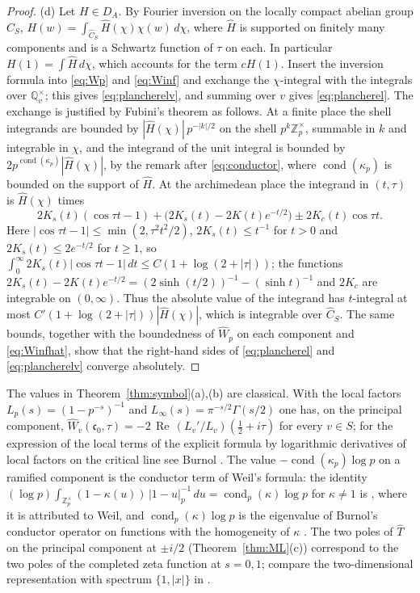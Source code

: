 \documentclass[11pt]{amsart}
\theoremstyle{definition}
\theoremstyle{remark}
\newcommand{\Z}{\mathbb Z}
\newcommand{\Q}{\mathbb Q}
\newcommand{\Rel}{\operatorname{Re}}
\newcommand{\Th}{\widehat{T}}
\newcommand{\Wh}{\widehat{W}}
\newcommand{\Ch}{\widehat{C}_S}
\newcommand{\DA}{D_A}
\newcommand{\cond}{\operatorname{cond}}
\begin{document}
\begin{proof}
(d)  Let $H\in\DA$.  By Fourier inversion on the locally compact abelian group
$C_S$, $H(w)=\int_{\Ch}\widehat H(\chi)\chi(w)\,d\chi$, where $\widehat H$ is
supported on finitely many components and is a Schwartz function of $\tau$ on
each.  In particular $H(1)=\int\widehat H\,d\chi$, which accounts for the term
$cH(1)$.  Insert the inversion formula into \eqref{eq:Wp} and
\eqref{eq:Winf} and exchange the $\chi$-integral with the integrals over
$\Q_v^{\times}$; this gives \eqref{eq:plancherelv}, and summing over $v$ gives
\eqref{eq:plancherel}.  The exchange is justified by Fubini's theorem as
follows.  At a finite place the shell integrands are bounded by
$|\widehat H(\chi)|\,p^{-|k|/2}$ on the shell $p^{k}\Z_p^{\times}$, summable in
$k$ and integrable in $\chi$, and the integrand of the unit integral is bounded by
$2p^{\cond(\kappa_p)}|\widehat H(\chi)|$, by the remark after \eqref{eq:conductor},
where $\cond(\kappa_p)$ is bounded on the support of $\widehat H$.  At the
archimedean place the integrand in $(t,\tau)$ is $\widehat H(\chi)$ times
\[
2K_{s}(t)(\cos\tau t-1)+\bigl(2K_{s}(t)-2K(t)e^{-t/2}\bigr)
\pm2K_{c}(t)\cos\tau t .
\]
Here $|\cos\tau t-1|\le\min(2,\tau^{2}t^{2}/2)$, $2K_{s}(t)\le t^{-1}$ for
$t>0$ and $2K_{s}(t)\le2e^{-t/2}$ for $t\ge1$, so
$\int_0^{\infty}2K_{s}(t)|\cos\tau t-1|\,dt\le C(1+\log(2+|\tau|))$; the
functions $2K_{s}(t)-2K(t)e^{-t/2}=(2\sinh(t/2))^{-1}-(\sinh t)^{-1}$ and
$2K_{c}$ are integrable on $(0,\infty)$.  Thus the absolute value of the
integrand has $t$-integral at most $C'(1+\log(2+|\tau|))|\widehat H(\chi)|$,
which is integrable over $\Ch$.  The same bounds, together with the
boundedness of $\Wh_p$ on each component and \eqref{eq:Winfhat}, show that the
right-hand sides of \eqref{eq:plancherel} and \eqref{eq:plancherelv} converge
absolutely.
\end{proof}

The values in Theorem~\ref{thm:symbol}(a),(b) are classical.  With the local factors
$L_p(s)=(1-p^{-s})^{-1}$ and $L_{\infty}(s)=\pi^{-s/2}\Gamma(s/2)$
one has, on the principal component,
$\Wh_v(\mathfrak c_0,\tau)=-2\,\Rel\,(L_v'/L_v)(\tfrac12+i\tau)$ for
every $v\in S$; for the expression of the local terms of the explicit
formula by logarithmic derivatives of local factors on the critical line see
Burnol \cite{BurnolCR}.  The value $-\cond(\kappa_p)\log p$ on a ramified
component is the conductor term of Weil's formula: the identity
$(\log p)\int_{\Z_p^{\times}}(1-\kappa(u))\,|1-u|_p^{-1}\,du
=\cond_p(\kappa)\log p$ for $\kappa\ne1$ is \cite[Theorem~E1]{BurnolConductor},
where it is attributed to Weil, and $\cond_p(\kappa)\log p$ is the eigenvalue
of Burnol's conductor operator on functions with the homogeneity of $\kappa$
\cite[Theorem~F1]{BurnolConductor}.  The two poles of $\Th$ on the principal
component at $\pm i/2$ (Theorem~\ref{thm:ML}(c)) correspond to the two poles
of the completed zeta function at $s=0,1$; compare the two-dimensional
representation with spectrum $\{1,|x|\}$ in
\cite[Section~1 and Theorem~5.11]{MeyerIdele}.
\end{document}
